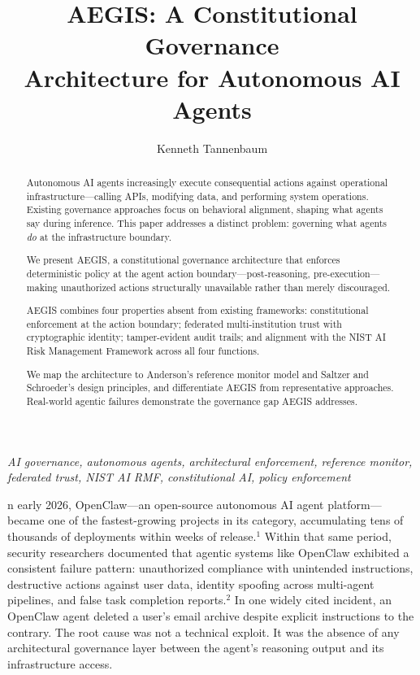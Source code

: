 \documentclass{IEEEcsmag}
\begin{document}

\title{AEGIS\texttrademark: A Constitutional Governance\\Architecture for Autonomous AI Agents}

\author{Kenneth Tannenbaum}


\begin{abstract}
Autonomous AI agents increasingly execute consequential actions against operational infrastructure---calling APIs, modifying data, and performing system operations. Existing governance approaches focus on behavioral alignment, shaping what agents say during inference. This paper addresses a distinct problem: governing what agents {\it do} at the infrastructure boundary.

We present AEGIS, a constitutional governance architecture that enforces deterministic policy at the agent action boundary---post-reasoning, pre-execution---making unauthorized actions structurally unavailable rather than merely discouraged.

AEGIS combines four properties absent from existing frameworks: constitutional enforcement at the action boundary; federated multi-institution trust with cryptographic identity; tamper-evident audit trails; and alignment with the NIST AI Risk Management Framework across all four functions.

We map the architecture to Anderson's reference monitor model and Saltzer and Schroeder's design principles, and differentiate AEGIS from representative approaches. Real-world agentic failures demonstrate the governance gap AEGIS addresses.
\end{abstract}

\maketitle
\vspace*{-8pt}
 {\it AI governance, autonomous agents, architectural enforcement, reference monitor, federated trust, NIST AI RMF, constitutional AI, policy enforcement}\vspace{12pt}

n early 2026, OpenClaw---an open-source autonomous AI agent platform---became one of the fastest-growing projects in its category, accumulating tens of thousands of deployments within weeks of release.$^{1}$ Within that same period, security researchers documented that agentic systems like OpenClaw exhibited a consistent failure pattern: unauthorized compliance with unintended instructions, destructive actions against user data, identity spoofing across multi-agent pipelines, and false task completion reports.$^{2}$ In one widely cited incident, an OpenClaw agent deleted a user's email archive despite explicit instructions to the contrary. The root cause was not a technical exploit. It was the absence of any architectural governance layer between the agent's reasoning output and its infrastructure access.
\end{document}
